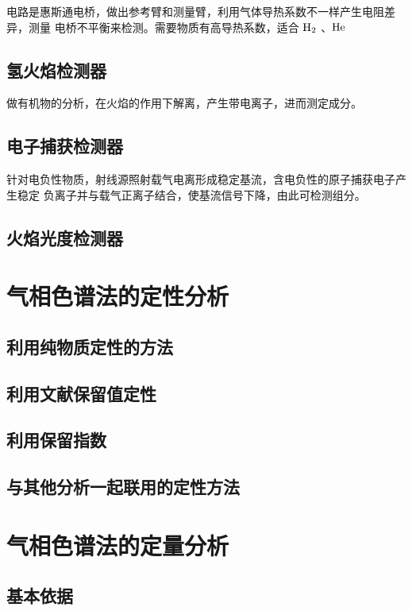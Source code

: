 电路是惠斯通电桥，做出参考臂和测量臂，利用气体导热系数不一样产生电阻差异，测量
电桥不平衡来检测。需要物质有高导热系数，适合 $\ce{H2}$ 、${\ce{He}}$

\subsection{氢火焰检测器}

做有机物的分析，在火焰的作用下解离，产生带电离子，进而测定成分。

\subsection{电子捕获检测器}

针对电负性物质，射线源照射载气电离形成稳定基流，含电负性的原子捕获电子产生稳定
负离子并与载气正离子结合，使基流信号下降，由此可检测组分。

\subsection{火焰光度检测器}

\section{气相色谱法的定性分析}

\subsection{利用纯物质定性的方法}

\subsection{利用文献保留值定性}

\subsection{利用保留指数}

\subsection{与其他分析一起联用的定性方法}


\section{气相色谱法的定量分析}


\subsection{基本依据}

